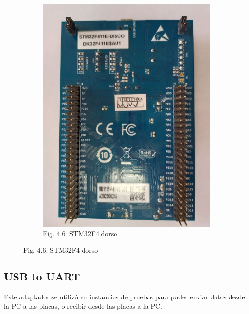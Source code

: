 \documentclass[12pt]{article}
\begin{document}
\begin{figure}[ht]
\begin{subfigure}[b]{0.45\linewidth}
    \includegraphics[width=\linewidth]{images/STM32F4-2.jpg}
    \caption{Fig. 4.6: STM32F4 dorso}
  \end{subfigure}
\end{figure}


\subsection{USB to UART}
Este adaptador se utilizó en instancias de pruebas para poder enviar datos desde la PC a las placas, o recibir desde las placas a la PC.
\end{document}
